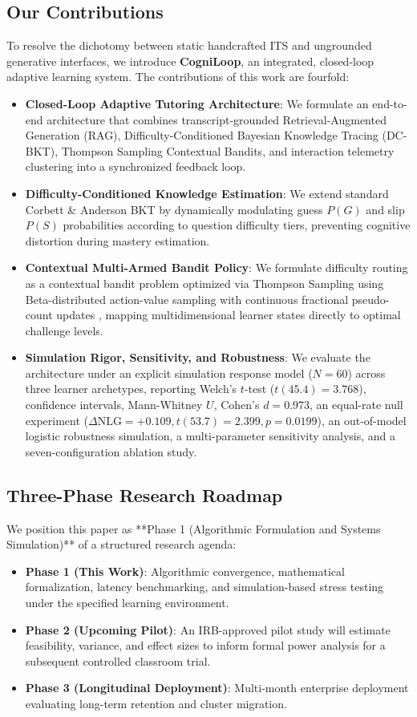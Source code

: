\documentclass[journal]{IEEEtran}
\begin{document}
\subsection{Our Contributions}
To resolve the dichotomy between static handcrafted ITS and ungrounded generative interfaces, we introduce \textbf{CogniLoop}, an integrated, closed-loop adaptive learning system. The contributions of this work are fourfold:
\begin{itemize}
    \item \textbf{Closed-Loop Adaptive Tutoring Architecture}: We formulate an end-to-end architecture that combines transcript-grounded Retrieval-Augmented Generation (RAG), Difficulty-Conditioned Bayesian Knowledge Tracing (DC-BKT), Thompson Sampling Contextual Bandits, and interaction telemetry clustering into a synchronized feedback loop.
    \item \textbf{Difficulty-Conditioned Knowledge Estimation}: We extend standard Corbett \& Anderson BKT \cite{corbett1994knowledge} by dynamically modulating guess $P(G)$ and slip $P(S)$ probabilities according to question difficulty tiers, preventing cognitive distortion during mastery estimation.
    \item \textbf{Contextual Multi-Armed Bandit Policy}: We formulate difficulty routing as a contextual bandit problem optimized via Thompson Sampling using Beta-distributed action-value sampling with continuous fractional pseudo-count updates \cite{agrawal2012analysis, chapelle2011empirical}, mapping multidimensional learner states directly to optimal challenge levels.
    \item \textbf{Simulation Rigor, Sensitivity, and Robustness}: We evaluate the architecture under an explicit simulation response model ($N=60$) across three learner archetypes, reporting Welch's $t$-test ($t(45.4)=3.768$), confidence intervals, Mann-Whitney $U$, Cohen's $d = 0.973$, an equal-rate null experiment ($\Delta\text{NLG}=+0.109, t(53.7)=2.399, p=0.0199$), an out-of-model logistic robustness simulation, a multi-parameter sensitivity analysis, and a seven-configuration ablation study.
\end{itemize}

\subsection{Three-Phase Research Roadmap}
We position this paper as **Phase 1 (Algorithmic Formulation and Systems Simulation)** of a structured research agenda:
\begin{itemize}
    \item \textbf{Phase 1 (This Work)}: Algorithmic convergence, mathematical formalization, latency benchmarking, and simulation-based stress testing under the specified learning environment.
    \item \textbf{Phase 2 (Upcoming Pilot)}: An IRB-approved pilot study will estimate feasibility, variance, and effect sizes to inform formal power analysis for a subsequent controlled classroom trial.
    \item \textbf{Phase 3 (Longitudinal Deployment)}: Multi-month enterprise deployment evaluating long-term retention and cluster migration.
\end{itemize}
\end{document}
